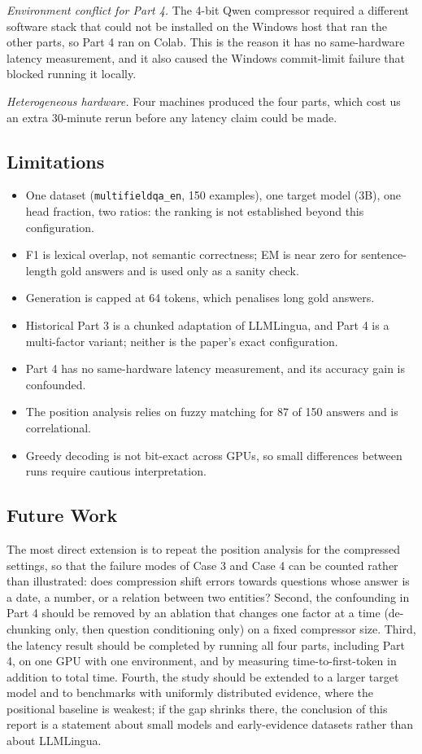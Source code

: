 \documentclass[10pt,a4paper,twocolumn]{article}
\begin{document}
\emph{Environment conflict for Part 4.} The 4-bit Qwen compressor required a
different software stack that could not be installed on the Windows host that ran
the other parts, so Part 4 ran on Colab. This is the reason it has no
same-hardware latency measurement, and it also caused the Windows
commit-limit failure that blocked running it locally.

\emph{Heterogeneous hardware.} Four machines produced the four parts, which cost us
an extra 30-minute rerun before any latency claim could be made.

\subsection{Limitations}

\begin{itemize}
    \item One dataset (\texttt{multifieldqa\_en}, 150 examples), one target model
    (3B), one head fraction, two ratios: the ranking is not established beyond
    this configuration.
    \item F1 is lexical overlap, not semantic correctness; EM is near zero for
    sentence-length gold answers and is used only as a sanity check.
    \item Generation is capped at 64 tokens, which penalises long gold answers.
    \item Historical Part 3 is a chunked adaptation of LLMLingua, and Part 4 is a
    multi-factor variant; neither is the paper's exact configuration.
    \item Part 4 has no same-hardware latency measurement, and its accuracy gain is
    confounded.
    \item The position analysis relies on fuzzy matching for 87 of 150 answers and
    is correlational.
    \item Greedy decoding is not bit-exact across GPUs, so small differences between runs require cautious interpretation.
\end{itemize}

\subsection{Future Work}

The most direct extension is to repeat the position analysis for the compressed
settings, so that the failure modes of Case 3 and Case 4 can be counted rather
than illustrated: does compression shift errors towards questions whose answer is
a date, a number, or a relation between two entities? Second, the confounding in
Part 4 should be removed by an ablation that changes one factor at a time
(de-chunking only, then question conditioning only) on a fixed compressor size.
Third, the latency result should be completed by running all four parts, including
Part 4, on one GPU with one environment, and by measuring time-to-first-token in
addition to total time. Fourth, the study should be extended to a larger target
model and to benchmarks with uniformly distributed evidence, where the positional
baseline is weakest; if the gap shrinks there, the conclusion of this report is a
statement about small models and early-evidence datasets rather than about
LLMLingua.
\end{document}
